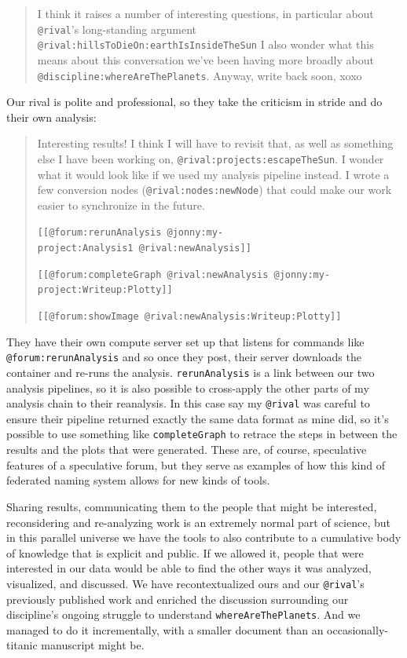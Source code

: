 \documentclass[10pt]{article}
\begin{document}
\begin{multicols}{2}
\begin{quote}
I think it raises a number of interesting questions, in particular about
\texttt{@rival}'s long-standing argument
\texttt{@rival:hillsToDieOn:earthIsInsideTheSun} I also wonder what this
means about this conversation we've been having more broadly about
\texttt{@discipline:whereAreThePlanets}. Anyway, write back soon, xoxo
\end{quote}

Our rival is polite and professional, so they take the criticism in
stride and do their own analysis:

\begin{quote}
Interesting results! I think I will have to revisit that, as well as
something else I have been working on,
\texttt{@rival:projects:escapeTheSun}. I wonder what it would look like
if we used my analysis pipeline instead. I wrote a few conversion nodes
(\texttt{@rival:nodes:newNode}) that could make our work easier to
synchronize in the future.

\texttt{{[}{[}@forum:rerunAnalysis\ @jonny:my-project:Analysis1\ @rival:newAnalysis{]}{]}}

\texttt{{[}{[}@forum:completeGraph\ @rival:newAnalysis\ @jonny:my-project:Writeup:Plotty{]}{]}}

\texttt{{[}{[}@forum:showImage\ @rival:newAnalysis:Writeup:Plotty{]}{]}}
\end{quote}

They have their own compute server set up that listens for commands like
\texttt{@forum:rerunAnalysis} and so once they post, their server
downloads the container and re-runs the analysis. \texttt{rerunAnalysis}
is a link between our two analysis pipelines, so it is also possible to
cross-apply the other parts of my analysis chain to their reanalysis. In
this case say my \texttt{@rival} was careful to ensure their pipeline
returned exactly the same data format as mine did, so it's possible to
use something like \texttt{completeGraph} to retrace the steps in
between the results and the plots that were generated. These are, of
course, speculative features of a speculative forum, but they serve as
examples of how this kind of federated naming system allows for new
kinds of tools.

Sharing results, communicating them to the people that might be
interested, reconsidering and re-analyzing work is an extremely normal
part of science, but in this parallel universe we have the tools to also
contribute to a cumulative body of knowledge that is explicit and
public. If we allowed it, people that were interested in our data would
be able to find the other ways it was analyzed, visualized, and
discussed. We have recontextualized ours and our \texttt{@rival}'s
previously published work and enriched the discussion surrounding our
discipline's ongoing struggle to understand \texttt{whereAreThePlanets}.
And we managed to do it incrementally, with a smaller document than an
occasionally-titanic manuscript might be.


\end{multicols}
\end{document}
